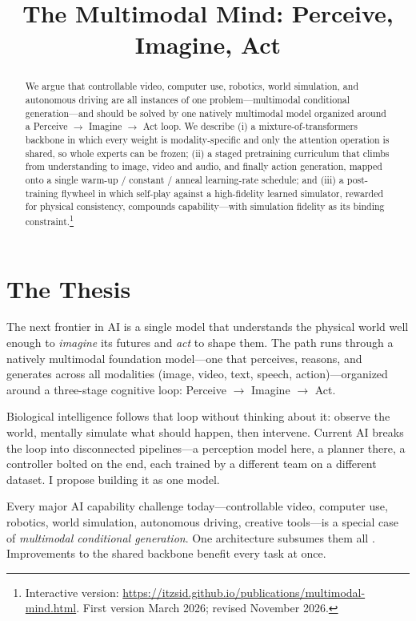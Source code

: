 \documentclass[10pt,conference]{IEEEtran}
\title{The Multimodal Mind: Perceive, Imagine, Act}
\author{\IEEEauthorblockN{Siddharth Choudhary}}
\begin{document}
\maketitle

\begin{abstract}
We argue that controllable video, computer use, robotics, world simulation, and
autonomous driving are all instances of one problem---multimodal conditional
generation---and should be solved by one natively multimodal model organized
around a Perceive $\rightarrow$ Imagine $\rightarrow$ Act loop. We describe (i) a
mixture-of-transformers backbone in which every weight is modality-specific and
only the attention operation is shared, so whole experts can be frozen; (ii) a
staged pretraining curriculum that climbs from understanding to image, video and
audio, and finally action generation, mapped onto a single warm-up / constant /
anneal learning-rate schedule; and (iii) a post-training flywheel in which
self-play against a high-fidelity learned simulator, rewarded for physical
consistency, compounds capability---with simulation fidelity as its binding
constraint.\footnote{Interactive version:
\url{https://itzsid.github.io/publications/multimodal-mind.html}. First version
March 2026; revised November 2026.}
\end{abstract}

\section{The Thesis}
The next frontier in AI is a single model that understands the physical world
well enough to \emph{imagine} its futures and \emph{act} to shape them. The path
runs through a natively multimodal foundation model---one that perceives,
reasons, and generates across all modalities (image, video, text, speech,
action)---organized around a three-stage cognitive loop: Perceive $\rightarrow$
Imagine $\rightarrow$ Act.

Biological intelligence follows that loop without thinking about it: observe the
world, mentally simulate what should happen, then intervene. Current AI breaks
the loop into disconnected pipelines---a perception model here, a planner there,
a controller bolted on the end, each trained by a different team on a different
dataset. I propose building it as one model.

Every major AI capability challenge today---controllable video, computer use,
robotics, world simulation, autonomous driving, creative tools---is a special
case of \emph{multimodal conditional generation}. One architecture subsumes them
all \cite{ref19}. Improvements to the shared backbone benefit every task at once.
\end{document}
